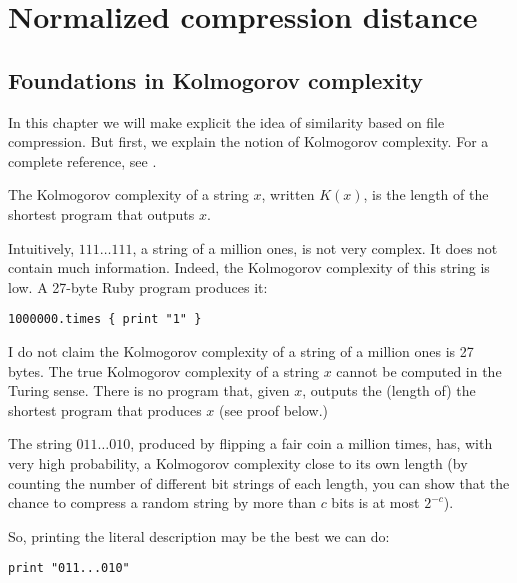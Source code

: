 
\chapter{Normalized compression distance} %

\label{Chapter2} %


\section{Foundations in Kolmogorov complexity}

In this chapter we will make explicit the idea of similarity based on file compression. But first, we explain the notion of Kolmogorov complexity. For a complete reference, see \cite{li2009introduction}.

The Kolmogorov complexity of a string $x$, written $K(x)$, is the length of the shortest program that outputs $x$.

Intuitively, $111\dots111$, a string of a million ones, is not very complex. It does not contain much information. Indeed, the Kolmogorov complexity of this string is low. A 27-byte Ruby program produces it:

\begin{verbatim}
1000000.times { print "1" }
\end{verbatim}

I do not claim the Kolmogorov complexity of a string of a million ones is 27 bytes. The true Kolmogorov complexity of a string $x$ cannot be computed in the Turing sense. There is no program that, given $x$, outputs the (length of) the shortest program that produces $x$ (see proof below.)

The string $011\dots010$, produced by flipping a fair coin a million times, has, with very high probability, a Kolmogorov complexity close to its own length (by counting the number of different bit strings of each length, you can show that the chance to compress a random string by more than $c$ bits is at most $2^{-c}$).

So, printing the literal description may be the best we can do:

\begin{verbatim}
print "011...010"
\end{verbatim}

